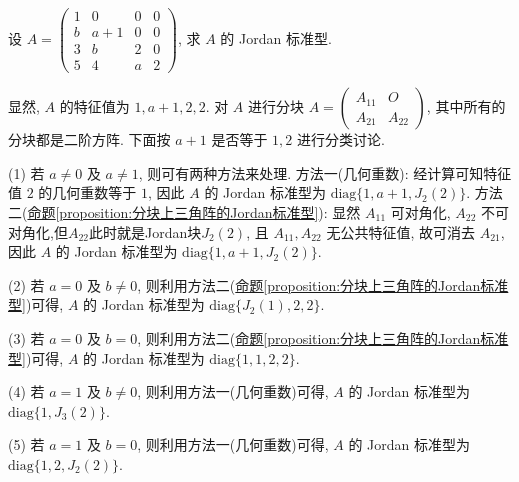 \documentclass[../../main.tex]{subfiles}%
\begin{document}
\begin{example}
设 $A = \begin{pmatrix}
1 & 0 & 0 & 0 \\
b & a + 1 & 0 & 0 \\
3 & b & 2 & 0 \\
5 & 4 & a & 2
\end{pmatrix}$, 求 $A$ 的 Jordan 标准型.
\end{example}
\begin{solution}

显然, $A$ 的特征值为 $1,a + 1,2,2$. 对 $A$ 进行分块 $A = \begin{pmatrix}A_{11} & O \\ A_{21} & A_{22}\end{pmatrix}$, 其中所有的分块都是二阶方阵. 下面按 $a + 1$ 是否等于 $1,2$ 进行分类讨论.

(1) 若 $a \neq 0$ 及 $a \neq 1$, 则可有两种方法来处理. {\heiti 方法一}(几何重数): 经计算可知特征值 $2$ 的几何重数等于 $1$, 因此 $A$ 的 Jordan 标准型为 $\mathrm{diag}\{1,a + 1,J_2(2)\}$. {\heiti 方法二}(\hyperref[proposition:分块上三角阵的Jordan标准型]{命题\ref{proposition:分块上三角阵的Jordan标准型}}): 显然 $A_{11}$ 可对角化, $A_{22}$ 不可对角化,但$A_{22}$此时就是Jordan块$J_2(2)$, 且 $A_{11},A_{22}$ 无公共特征值, 故可消去 $A_{21}$, 因此 $A$ 的 Jordan 标准型为 $\mathrm{diag}\{1,a + 1,J_2(2)\}$.

(2) 若 $a = 0$ 及 $b \neq 0$, 则利用{\heiti 方法二}(\hyperref[proposition:分块上三角阵的Jordan标准型]{命题\ref{proposition:分块上三角阵的Jordan标准型}})可得, $A$ 的 Jordan 标准型为 $\mathrm{diag}\{J_2(1),2,2\}$.

(3) 若 $a = 0$ 及 $b = 0$, 则利用{\heiti 方法二}(\hyperref[proposition:分块上三角阵的Jordan标准型]{命题\ref{proposition:分块上三角阵的Jordan标准型}})可得, $A$ 的 Jordan 标准型为 $\mathrm{diag}\{1,1,2,2\}$.

(4) 若 $a = 1$ 及 $b \neq 0$, 则利用{\heiti 方法一}(几何重数)可得, $A$ 的 Jordan 标准型为 $\mathrm{diag}\{1,J_3(2)\}$.

(5) 若 $a = 1$ 及 $b = 0$, 则利用{\heiti 方法一}(几何重数)可得, $A$ 的 Jordan 标准型为 $\mathrm{diag}\{1,2,J_2(2)\}$. 

\end{solution}
\end{document}
